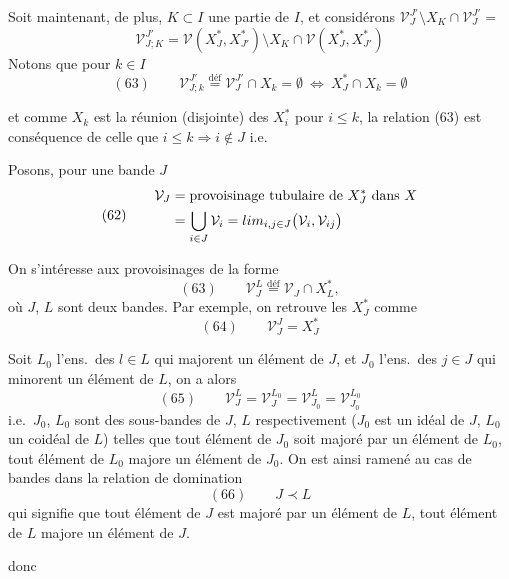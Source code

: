 \documentclass[11pt,a4paper]{article}
\begin{document}
Soit maintenant, de plus, $K\subset I$ une partie de $I$, et considérons \struck{\ill{}} $\mathcal V_J^{J'}\setminus X_K\cap \mathcal V_J^{J'}=$
\[
\mathcal V^{J'}_{J;K}=\mathcal V(X_J^{*},X_{J'}^{*})\setminus X_K\cap \mathcal V(X_J^{*},X_{J'}^{*})
\]
Notons que pour $k\in I$
\[
(63)\qquad \mathcal V^{J'}_{J;k}\overset{\text{déf}}{=}\mathcal V^{J'}_{J}\cap X_k=\emptyset\ \Longleftrightarrow\ X_J^{*}\cap X_k=\emptyset
\]

et comme $X_k$ est la réunion (disjointe) des $X_i^{*}$ pour $i\le k$, la relation (63) est conséquence de celle que $i\le k\Rightarrow i\notin J$ i.e.\ \struck{\ill{}}




Posons, pour une bande $J$
\[
(62)\qquad
\begin{aligned}
\mathcal V_J&=\text{provoisinage tubulaire de } X_J^{*} \text{ dans } X\\
&=\bigcup_{i\in J}\mathcal V_i=\varinjlim_{i,j\in J}\bigl(\mathcal V_i,\mathcal V_{ij}\bigr)
\end{aligned}
\]

On s'intéresse aux provoisinages de la forme
\[
(63)\qquad \mathcal V_J^{L}\overset{\text{déf}}{=}\mathcal V_J\cap X_L^{*},
\]
où $J$, $L$ sont deux bandes. Par exemple, on retrouve les $X_J^{*}$ comme
\[
(64)\qquad \mathcal V_J^{J}=X_J^{*}
\]



Soit $L_0$ l'ens.\ des $l\in L$ qui majorent un élément de $J$, et $J_0$ l'ens.\ des $j\in J$ qui minorent un élément de $L$, on a alors
\[
(65)\qquad \mathcal V_J^{L}=\mathcal V_J^{L_0}=\mathcal V_{J_0}^{L}=\mathcal V_{J_0}^{L_0}
\]
i.e.\ $J_0$, $L_0$ sont des sous-bandes de $J$, $L$ respectivement ($J_0$ est un idéal de $J$, $L_0$ un coidéal de $L$) telles que tout élément de $J_0$ soit majoré par un élément de $L_0$, tout élément de $L_0$ majore un élément de $J_0$. On est ainsi ramené au cas de bandes dans la relation de domination
\[
(66)\qquad J\prec L
\]
qui signifie que tout élément de $J$ est majoré par un élément de $L$, tout élément de $L$ majore un élément de $J$.

donc
\end{document}
